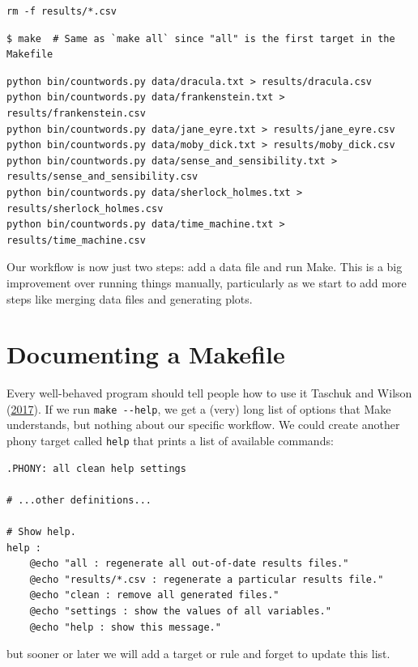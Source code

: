 \documentclass[
]{krantz}
\begin{document}
\begin{verbatim}
rm -f results/*.csv
\end{verbatim}

\begin{verbatim}
$ make  # Same as `make all` since "all" is the first target in the Makefile
\end{verbatim}

\begin{verbatim}
python bin/countwords.py data/dracula.txt > results/dracula.csv
python bin/countwords.py data/frankenstein.txt > results/frankenstein.csv
python bin/countwords.py data/jane_eyre.txt > results/jane_eyre.csv
python bin/countwords.py data/moby_dick.txt > results/moby_dick.csv
python bin/countwords.py data/sense_and_sensibility.txt > results/sense_and_sensibility.csv
python bin/countwords.py data/sherlock_holmes.txt > results/sherlock_holmes.csv
python bin/countwords.py data/time_machine.txt > results/time_machine.csv
\end{verbatim}

Our workflow is now just two steps:
add a data file and run Make.
This is a big improvement over running things manually,
particularly as we start to add more steps like merging data files and generating plots.

\hypertarget{automate-doc}{%
\section{Documenting a Makefile}\label{automate-doc}}

Every well-behaved program should tell people how to use it Taschuk and Wilson (\protect\hyperlink{ref-Tasc2017}{2017}).
If we run \texttt{make\ -\/-help},
we get a (very) long list of options that Make understands,
but nothing about our specific workflow.
We could create another phony target called \texttt{help} that prints a list of available commands:

\begin{verbatim}
.PHONY: all clean help settings

# ...other definitions...

# Show help.
help :
    @echo "all : regenerate all out-of-date results files."
    @echo "results/*.csv : regenerate a particular results file."
    @echo "clean : remove all generated files."
    @echo "settings : show the values of all variables."
    @echo "help : show this message."
\end{verbatim}

but sooner or later
we will add a target or rule and forget to update this list.
\end{document}
